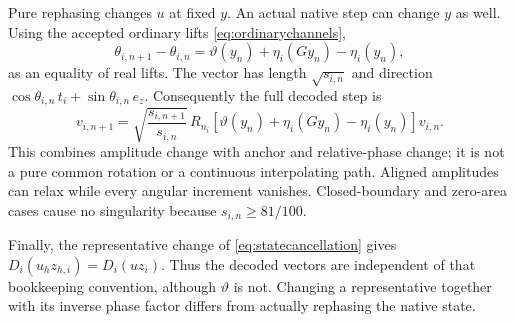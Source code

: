 Pure rephasing changes \(u\) at fixed \(y\). An actual native step can change \(y\) as well. Using the accepted ordinary lifts \eqref{eq:ordinarychannels},
\begin{equation}
\theta_{i,n+1}-\theta_{i,n}
=\vartheta(y_n)+\eta_i(Gy_n)-\eta_i(y_n),
\label{eq:channelincrement}
\end{equation}
as an equality of real lifts. The vector has length \(\sqrt{s_{i,n}}\) and direction
\(\cos\theta_{i,n}\,t_i+\sin\theta_{i,n}\,e_z\). Consequently the full decoded step is
\begin{equation}
\boxed{v_{i,n+1}=\sqrt{\frac{s_{i,n+1}}{s_{i,n}}}\,
R_{n_i}\!\left[\vartheta(y_n)+\eta_i(Gy_n)-\eta_i(y_n)\right]v_{i,n}.}
\label{eq:completestep}
\end{equation}
This combines amplitude change with anchor and relative-phase change; it is not a pure common rotation or a continuous interpolating path. Aligned amplitudes can relax while every angular increment vanishes. Closed-boundary and zero-area cases cause no singularity because \(s_{i,n}\ge81/100\).

Finally, the representative change of \eqref{eq:statecancellation} gives
\(D_i(u_hz_{h,i})=D_i(uz_i)\). Thus the decoded vectors are independent of that bookkeeping convention, although \(\vartheta\) is not. Changing a representative together with its inverse phase factor differs from actually rephasing the native state.
